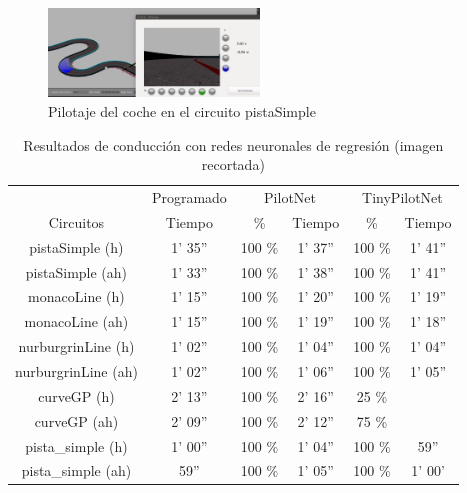\begin{figure}
\begin{center}
	\includegraphics[width=0.5\textwidth]{figures/Regresion/pilotnet_cropped.png}
   \caption{Pilotaje del coche en el circuito pistaSimple}
	\label{fig.simple_reg}
\end{center}
\end{figure}

\begin{table}[H]
\centering
\caption{Resultados de conducción con redes neuronales de regresión (imagen recortada)}
\label{resultados_regresion_recortada}
\begin{tabular}{c|c|c|c|c|c|}
\cline{2-6}
                          & \multicolumn{1}{c|}{Programado} & \multicolumn{2}{c|}{PilotNet} & \multicolumn{2}{c|}{TinyPilotNet} \\ \cline{1-6} 
                        \multicolumn{1}{|c|}{Circuitos}    & Tiempo       & \%       & Tiempo       & \%        & Tiempo         \\ \hline
\multicolumn{1}{|c|}{pistaSimple (h)}    & 1' 35''           & 100 \%         & 1' 37''       &  100 \%        & 1' 41''               \\ \hline
\multicolumn{1}{|c|}{pistaSimple (ah)}     & 1' 33''           & 100 \%          & 1' 38''           & 100 \%        & 1' 41''      \\ \hline
\multicolumn{1}{|c|}{monacoLine (h)}      & 1' 15''           & 100 \%            & 1' 20''            & 100 \%         & 1' 19''                \\ \hline
\multicolumn{1}{|c|}{monacoLine (ah)}       & 1' 15''       &  100 \%      & 1' 19''         & 100 \%          & 1' 18''         \\ \hline
\multicolumn{1}{|c|}{nurburgrinLine (h)}      & 1' 02''       &  100 \%         & 1' 04''           & 100 \%        & 1' 04''       \\ \hline
\multicolumn{1}{|c|}{nurburgrinLine (ah)}       & 1' 02''     & 100 \%         & 1' 06''          & 100 \%     & 1' 05''            \\ \hline
\multicolumn{1}{|c|}{curveGP (h)}     & 2' 13''           & 100 \%         & 2' 16''            & 25 \%        &              \\ \hline
\multicolumn{1}{|c|}{curveGP (ah)}       & 2' 09''            & 100 \%         & 2' 12''        & 75 \%        &         \\ \hline
\multicolumn{1}{|c|}{pista\_simple (h)}       & 1' 00''           & 100 \%       & 1' 04''            & 100 \%         & 59''        \\ \hline
\multicolumn{1}{|c|}{pista\_simple (ah)}     & 59''          & 100 \%       & 1' 05''         & 100 \%        & 1' 00'                 \\ \hline
\end{tabular}
\end{table}



